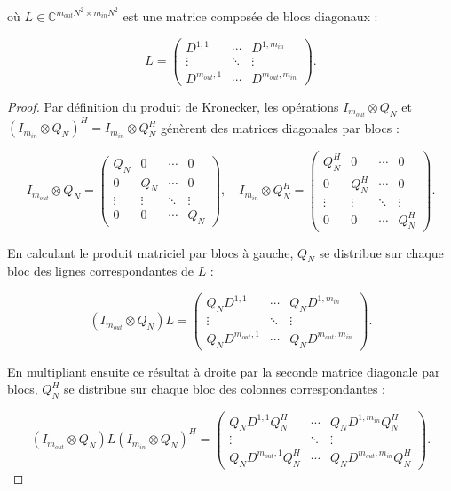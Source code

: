 où $L \in \mathbb{C}^{m_{out}N^2 \times m_{in}N^2}$ est une matrice composée de blocs diagonaux :

$$
L =
\begin{pmatrix}
D^{1,1} & \cdots & D^{1,m_{in}} \\
\vdots & \ddots & \vdots \\
D^{m_{out},1} & \cdots & D^{m_{out},m_{in}}
\end{pmatrix}.
$$

\vspace{0.5cm}
\begin{proof}

Par définition du produit de Kronecker, les opérations 
$I_{m_{out}} \otimes Q_N$ et $(I_{m_{in}} \otimes Q_N)^H = I_{m_{in}} \otimes Q_N^H$ 
génèrent des matrices diagonales par blocs :

$$
I_{m_{out}} \otimes Q_N = 
\begin{pmatrix}
Q_N & 0 & \cdots & 0 \\
0 & Q_N & \cdots & 0 \\
\vdots & \vdots & \ddots & \vdots \\
0 & 0 & \cdots & Q_N
\end{pmatrix},
\quad
I_{m_{in}} \otimes Q_N^H = 
\begin{pmatrix}
Q_N^H & 0 & \cdots & 0 \\
0 & Q_N^H & \cdots & 0 \\
\vdots & \vdots & \ddots & \vdots \\
0 & 0 & \cdots & Q_N^H
\end{pmatrix}.
$$

En calculant le produit matriciel par blocs à gauche, $Q_N$ se distribue sur chaque bloc des lignes 
correspondantes de $L$ :

$$
(I_{m_{out}} \otimes Q_N) L = 
\begin{pmatrix}
Q_N D^{1,1} & \cdots & Q_N D^{1,m_{in}} \\
\vdots & \ddots & \vdots \\
Q_N D^{m_{out},1} & \cdots & Q_N D^{m_{out},m_{in}}
\end{pmatrix}.
$$

En multipliant ensuite ce résultat à droite par la seconde matrice diagonale par blocs, 
$Q_N^H$ se distribue sur chaque bloc des colonnes correspondantes :

$$
(I_{m_{out}} \otimes Q_N) L (I_{m_{in}} \otimes Q_N)^H = 
\begin{pmatrix}
Q_N D^{1,1} Q_N^H & \cdots & Q_N D^{1,m_{in}} Q_N^H \\
\vdots & \ddots & \vdots \\
Q_N D^{m_{out},1} Q_N^H & \cdots & Q_N D^{m_{out},m_{in}} Q_N^H
\end{pmatrix}.
$$


\end{proof}
